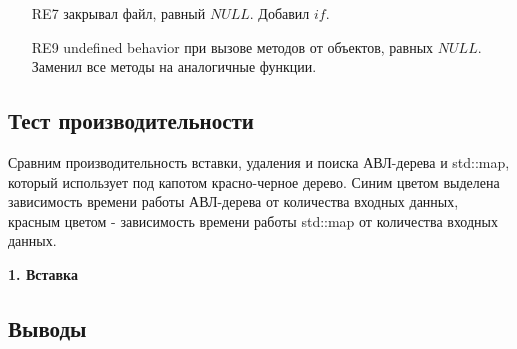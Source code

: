 \documentclass[12pt]{article}
\begin{document}
	\begin{itemize}
		\item[RE7] закрывал файл, равный $NULL$. Добавил $if$.
		\item[RE9] undefined behavior при вызове методов от объектов, равных $NULL$. Заменил все методы на аналогичные функции.
	\end{itemize}
	
	\subsection*{Тест производительности}
	
	Сравним производительность вставки, удаления и поиска АВЛ-дерева и std::map, который использует под капотом красно-черное дерево. Синим цветом выделена зависимость времени работы АВЛ-дерева от количества входных данных, красным цветом - зависимость времени работы std::map от количества входных данных. \\[1mm]
	
	\newpage
		
	\textbf{1. Вставка} \\
	
	
	\subsection*{Выводы}
	
	
\end{document}
